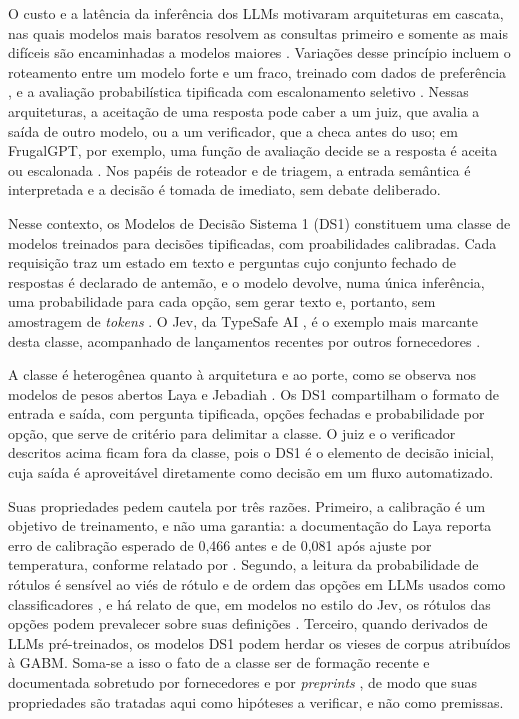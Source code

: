 \documentclass[12pt,oneside,a4paper,brazil,sumario=tradicional]{abntex2}
\begin{document}
O custo e a latência da inferência dos LLMs motivaram arquiteturas em cascata, nas quais modelos mais baratos resolvem as consultas primeiro e somente as mais difíceis são encaminhadas a modelos maiores \parencite{chen2023}. Variações desse princípio incluem o roteamento entre um modelo forte e um fraco, treinado com dados de preferência \parencite{ong2025}, e a avaliação probabilística tipificada com escalonamento seletivo \parencite{nandakishore2026}. Nessas arquiteturas, a aceitação de uma resposta pode caber a um juiz, que avalia a saída de outro modelo, ou a um verificador, que a checa antes do uso; em FrugalGPT, por exemplo, uma função de avaliação decide se a resposta é aceita ou escalonada \parencite{chen2023}. Nos papéis de roteador e de triagem, a entrada semântica é interpretada e a decisão é tomada de imediato, sem debate deliberado.

Nesse contexto, os Modelos de Decisão Sistema 1 (DS1) constituem uma classe de modelos treinados para decisões tipificadas, com proabilidades calibradas. Cada requisição traz um estado em texto e perguntas cujo conjunto fechado de respostas é declarado de antemão, e o modelo devolve, numa única inferência, uma probabilidade para cada opção, sem gerar texto e, portanto, sem amostragem de \textit{tokens} \parencite{typesafe2026, laya2026}. O Jev, da TypeSafe AI \parencite{typesafe2026}, é o exemplo mais marcante desta classe, acompanhado de lançamentos recentes por outros fornecedores \parencite{microsoft2026, cloudflare2026, openai2026}.

A classe é heterogênea quanto à arquitetura e ao porte, como se observa nos modelos de pesos abertos Laya \parencite{laya2026} e Jebadiah \parencite{frontierinfra2026}. Os DS1 compartilham o formato de entrada e saída, com pergunta tipificada, opções fechadas e probabilidade por opção, que serve de critério para delimitar a classe. O juiz e o verificador descritos acima ficam fora da classe, pois o DS1 é o elemento de decisão inicial, cuja saída é aproveitável diretamente como decisão em um fluxo automatizado.

Suas propriedades pedem cautela por três razões. Primeiro, a calibração é um objetivo de treinamento, e não uma garantia: a documentação do Laya reporta erro de calibração esperado de 0,466 antes e de 0,081 após ajuste por temperatura, conforme relatado por \textcite{santos2026}. Segundo, a leitura da probabilidade de rótulos é sensível ao viés de rótulo e de ordem das opções em LLMs usados como classificadores \parencite{zhao2021}, e há relato de que, em modelos no estilo do Jev, os rótulos das opções podem prevalecer sobre suas definições \parencite{azizi2026labelsoverridedefinitionsjevstyle}. Terceiro, quando derivados de LLMs pré-treinados, os modelos DS1 podem herdar os vieses de corpus atribuídos à GABM. Soma-se a isso o fato de a classe ser de formação recente e documentada sobretudo por fornecedores e por \textit{preprints} \parencite{du2026reliable, santos2026, azizi2026labelsoverridedefinitionsjevstyle}, de modo que suas propriedades são tratadas aqui como hipóteses a verificar, e não como premissas.
\end{document}
